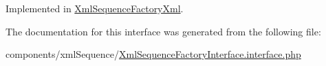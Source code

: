 Implemented in \hyperlink{class_xml_sequence_factory_xml_65967fe6cc76b0c0b28aa39e9acffcab}{XmlSequenceFactoryXml}.

The documentation for this interface was generated from the following file:\begin{CompactItemize}
\item 
components/xmlSequence/\hyperlink{_xml_sequence_factory_interface_8interface_8php}{XmlSequenceFactoryInterface.interface.php}\end{CompactItemize}
